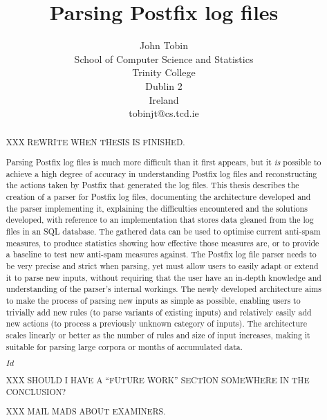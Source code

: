 \documentclass[a4paper,12pt,draft]{report}
\begin{document}
\title{Parsing Postfix log files}
\author{John Tobin \\ School of Computer Science and Statistics \\
Trinity College \\ Dublin 2 \\ Ireland \\ tobinjt@cs.tcd.ie}
\maketitle

\begin{abstract}

    \setcounter{page}{2}

    XXX REWRITE WHEN THESIS IS FINISHED\@.

    Parsing Postfix log files is much more difficult than it first appears,
    but it \textit{is\/} possible to achieve a high degree of accuracy in
    understanding Postfix log files and reconstructing the actions taken by
    Postfix that generated the log files.  This thesis describes the
    creation of a parser for Postfix log files, documenting the
    architecture developed and the parser implementing it, explaining the
    difficulties encountered and the solutions developed, with reference to
    an implementation that stores data gleaned from the log files in an SQL
    database.  The gathered data can be used to optimise current anti-spam
    measures, to produce statistics showing how effective those measures
    are, or to provide a baseline to test new anti-spam measures against.
    The Postfix log file parser needs to be very precise and strict when
    parsing, yet must allow users to easily adapt or extend it to parse new
    inputs, without requiring that the user have an in-depth knowledge and
    understanding of the parser's internal workings.  The newly developed
    architecture aims to make the process of parsing new inputs as simple
    as possible, enabling users to trivially add new rules (to parse
    variants of existing inputs) and relatively easily add new actions (to
    process a previously unknown category of inputs).  The architecture
    scales linearly or better as the number of rules and size of input
    increases, making it suitable for parsing large corpora or months of
    accumulated data.

    \SVN$Id$
    \begin{center}
        \SVNId{}
    \end{center}

    XXX SHOULD I HAVE A ``FUTURE WORK'' SECTION SOMEWHERE IN THE
    CONCLUSION\@?

    XXX MAIL MADS ABOUT EXAMINERS\@.

\end{abstract}
\end{document}
